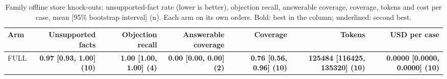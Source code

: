 \begin{table}[htbp]
\centering\footnotesize
\begin{adjustbox}{max width=\textwidth}
\begin{tabular}{@{}lrrrrrr@{}}
\toprule
Arm & Unsupported facts & Objection recall & Answerable coverage & Coverage & Tokens & USD per case \\
\midrule
FULL & \textbf{0.97 [0.93, 1.00] (10)} & \textbf{1.00 [1.00, 1.00] (4)} & \textbf{0.00 [0.00, 0.00] (2)} & \textbf{0.76 [0.56, 0.96] (10)} & \textbf{125484 [116425, 135320] (10)} & \textbf{0.0000 [0.0000, 0.0000] (10)} \\
\bottomrule
\end{tabular}
\end{adjustbox}
\caption{Family offline store knock-outs: unsupported-fact rate (lower is better), objection recall, answerable coverage, coverage, tokens and cost per case, mean [95\% bootstrap interval] (n). Each arm on its own orders. Bold: best in the column; underlined: second best.}
\label{tab:table1b_shravani_off}
\end{table}